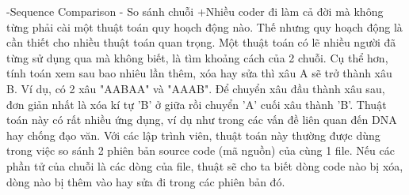 -Sequence Comparison - So sánh chuỗi
+Nhiều coder đi làm cả đời mà không từng phải cài một thuật toán quy hoạch động nào. 
Thế nhưng quy hoạch động là cần thiết cho nhiều thuật toán quan trọng. Một thuật toán 
có lẽ nhiều người đã từng sử dụng qua mà không biết, là tìm khoảng cách của 2 chuỗi. 
Cụ thể hơn, tính toán xem sau bao nhiêu lần thêm, xóa hay sửa thì xâu A sẽ trở thành xâu B.
Ví dụ, có 2 xâu "AABAA" và "AAAB". Để chuyển xâu đầu thành xâu sau, đơn giản nhất là xóa 
kí tự 'B' ở giữa rồi chuyển 'A' cuối xâu thành 'B'. Thuật toán này có rất nhiều ứng dụng, 
ví dụ như trong các vấn đề liên quan đến DNA hay chống đạo văn. Với các lập trình viên, thuật 
toán này thường được dùng trong việc so sánh 2 phiên bản source code (mã nguồn) của cùng 1 file. 
Nếu các phần tử của chuỗi là các dòng của file, thuật sẽ cho ta biết dòng code nào bị xóa, dòng 
nào bị thêm vào hay sửa đi trong các phiên bản đó.


